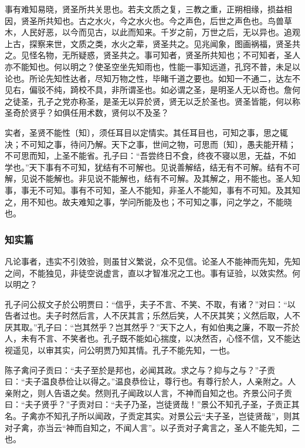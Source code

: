 \documentclass[]{article}
\begin{document}
事有难知易晓，贤圣所共关思也。若夫文质之复，三教之重，正朔相缘，损益相因，贤圣所共知也。古之水火，今之水火也。今之声色，后世之声色也。鸟兽草木，人民好恶，以今而见古，以此而知来。千岁之前，万世之后，无以异也。追观上古，探察来世，文质之类，水火之辈，贤圣共之。见兆闻象，图画祸福，贤圣共之。见怪名物，无所疑惑，贤圣共之。事可知者，贤圣所共知也；不可知者，圣人亦不能知也。何以明之？使圣空坐先知雨也，性能一事知远道，孔窍不普，未足以论也。所论先知性达者，尽知万物之性，毕睹千道之要也。如知一不通二，达左不见右，偏驳不纯，踦校不具，非所谓圣也。如必谓之圣，是明圣人无以奇也。詹何之徒圣，孔子之党亦称圣，是圣无以异於贤，贤无以乏於圣也。贤圣皆能，何以称圣奇於贤乎？如俱任用术数，贤何以不及圣？

实者，圣贤不能性〔知〕，须任耳目以定情实。其任耳目也，可知之事，思之辄决；不可知之事，待问乃解。天下之事，世间之物，可思而〔知〕，愚夫能开精；不可思而知，上圣不能省。孔子曰：``吾尝终日不食，终夜不寝以思，无益，不如学也。''天下事有不可知，犹结有不可解也。见说善解结，结无有不可解。结有不可解，见说不能解也。非见说不能解也，结有不可解。及其解之，用不能也。圣人知事，事无不可知。事有不可知，圣人不能知，非圣人不能知，事有不可知。及其知之，用不知也。故夫难知之事，学问所能及也；不可知之事，问之学之，不能晓也。

\hypertarget{header-n878}{%
\subsubsection{知实篇}\label{header-n878}}

凡论事者，违实不引效验，则虽甘义繁说，众不见信。论圣人不能神而先知，先知之间，不能独见，非徒空说虚言，直以才智准况之工也。事有证验，以效实然。何以明之？

孔子问公叔文子於公明贾曰：``信乎，夫子不言、不笑、不取，有诸？''对曰：``以告者过也。夫子时然后言，人不厌其言；乐然后笑，人不厌其笑；义然后取，人不厌其取。''孔子曰：``岂其然乎？岂其然乎？''天下之人，有如伯夷之廉，不取一芥於人，未有不言、不笑者也。孔子既不能如心揣度，以决然否，心怪不信，又不能达视遥见，以审其实，问公明贾乃知其情。孔子不能先知，一也。

陈子禽问子贡曰：``夫子至於是邦也，必闻其政。求之与？抑与之与？''子贡曰：``夫子温良恭俭让以得之。''温良恭俭让，尊行也。有尊行於人，人亲附之。人亲附之，则人告语之矣。然则孔子闻政以人言，不神而自知之也。齐景公问子贡曰：``夫子贤乎？''子贡对曰：``夫子乃圣，岂徒贤哉！''景公不知孔子圣，子贡正其名。子禽亦不知孔子所以闻政，子贡定其实。对景公云``夫子圣，岂徒贤哉''，则其对子禽，亦当云``神而自知之，不闻人言''。以子贡对子禽言之，圣人不能先知，二也。
\end{document}
